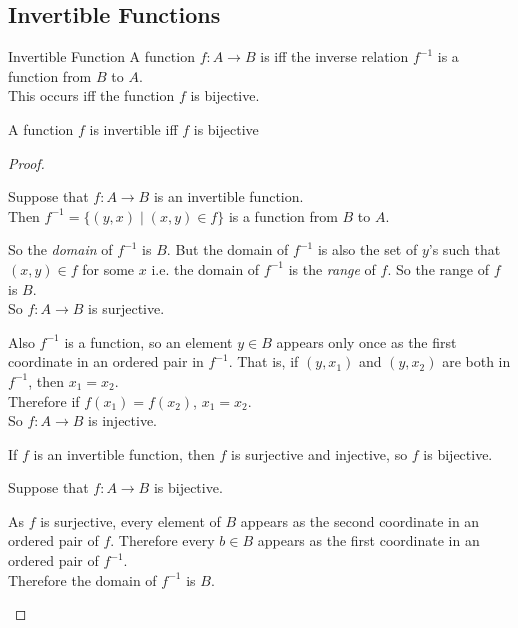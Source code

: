 \documentclass[../notes.tex]{subfiles}
\begin{document}
			\subsection{Invertible Functions}
				\begin{definition}{Invertible Function}
					A function $f: A \rightarrow B$ is  iff the inverse relation $f^{-1}$ is a function from $B$ to $A$.\\
					This occurs iff the function $f$ is bijective.
				\end{definition}
				\begin{theorem}{A function $f$ is invertible iff $f$ is bijective}
					\begin{proof}
						$ $
						\begin{indentparagraph}
							\begin{subproof}[Subproof]
								Suppose that $f: A \rightarrow B$ is an invertible function.\\
								Then $f^{-1} = \bigl\{(y, x) \mid (x, y) \in f\bigr\}$ is a function from $B$ to $A$.

								So the \emph{domain} of $f^{-1}$ is $B$. But the domain of $f^{-1}$ is also the set of $y$'s such that $(x, y) \in f$ for some $x$ i.e. the domain of $f^{-1}$ is the \emph{range} of $f$. So the range of $f$ is $B$.\\
								So $f: A \rightarrow B$ is surjective.

								Also $f^{-1}$ is a function, so an element $y \in B$ appears only once as the first coordinate in an ordered pair in $f^{-1}$. That is, if $(y, x_{1})$ and $(y, x_{2})$ are both in $f^{-1}$, then $x_{1} = x_{2}$.\\
								Therefore if $f(x_{1}) = f(x_{2})$, $x_{1} = x_{2}$.\\
								So $f: A \rightarrow B$ is injective.

								If $f$ is an invertible function, then $f$ is surjective and injective, so $f$ is bijective.
							\end{subproof}
							\begin{subproof}[Subproof]
								Suppose that $f: A \rightarrow B$ is bijective.

								As $f$ is surjective, every element of $B$ appears as the second coordinate in an ordered pair of $f$. Therefore every $b \in B$ appears as the first coordinate in an ordered pair of $f^{-1}$.\\
								Therefore the domain of $f^{-1}$ is $B$.


\end{subproof}
\end{indentparagraph}
\end{proof}
\end{theorem}
\end{document}
